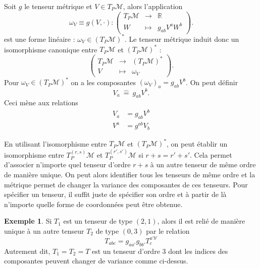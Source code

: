 \documentclass[a4paper,11pt]{report}
\theoremstyle{definition}
\theoremstyle{plain}
\theoremstyle{definition}
\newtheorem{exmp}{Exemple}[chapter]
\theoremstyle{remark}
\newcommand{\M}{\mathscr{M}}
\begin{document}
                Soit $g$ le tenseur métrique et $V\in T_P\M$, alors l'application
                \begin{equation}
                    \omega_V\equiv g(V,\cdot):\left(
                \begin{array}{ccc}
                    T_P\M & \longrightarrow & \mathbb{R} \\
                    W & \longmapsto & g_{ab}V^a W^b
                \end{array}
                \right).
                \end{equation}
                est une forme linéaire : $\omega_V\in(T_P\M)^*$. Le tenseur métrique induit donc un isomorphisme canonique entre $T_P\M$ et $(T_P\M)^*$ :
                \begin{equation}
                    \left(
                \begin{array}{ccc}
                    T_P\M & \longrightarrow & (T_P\M)^* \\
                    V & \longmapsto & \omega_V
                \end{array}
                \right).
                \end{equation}
                Pour $\omega_V\in(T_P\M)^*$ on a les composantes $(\omega_V)_a = g_{ab}V^b$. On peut définir 
                \begin{equation}
                    V_a ~\hat{=}~ g_{ab}V^b.
                \end{equation}
                Ceci mène aux relations 
                \begin{align}
                    V_a &= g_{ab}V^b \\
                    V^a &= g^{ab}V_b
                \end{align}
                
                En utilisant l'isomorphisme entre $T_P\M$ et $(T_P\M)^*$, on peut établir un isomorphisme entre $T_P^{(r,s)}\M$ et $T_P^{(r',s')}\M$ si $r+s=r'+s'$. Cela permet d'associer n'importe quel tenseur d'ordre $r+s$ à un autre tenseur de même ordre de manière unique. On peut alors identifier tous les tenseurs de même ordre et la métrique permet de changer la variance des composantes de ces tenseurs. Pour spécifier un tenseur, il suffit juste de spécifier son ordre et à partir de là n'importe quelle forme de coordonnées peut être obtenue.
                
                \begin{exmp}
                    Si $T_1$ est un tenseur de type $(2,1)$, alors il est relié de manière unique à un autre tenseur $T_2$ de type $(0,3)$ par le relation
                    \begin{equation}
                        T_{abc} = g_{aa'}g_{bb'}T^{a'b'}_c
                    \end{equation}
                    Autrement dit, $T_1 = T_2 = T$ est un tenseur d'ordre $3$ dont les indices des composantes peuvent changer de variance comme ci-dessus.
                \end{exmp}
                
\end{document}

